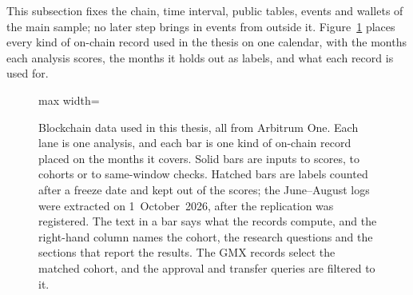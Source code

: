
This subsection fixes the chain, time interval, public tables, events and wallets of the main sample; no later step brings in events from outside it. Figure~\ref{fig:data-overview} places every kind of on-chain record used in the thesis on one calendar, with the months each analysis scores, the months it holds out as labels, and what each record is used for.

\begin{figure}[htbp]
\centering
\begin{adjustbox}{max width=\linewidth}

\end{adjustbox}
\caption[{Blockchain data used in this thesis: sources, months covered, held-out labels and uses.}]{Blockchain data used in this thesis, all from Arbitrum One. Each lane is one analysis, and each bar is one kind of on-chain record placed on the months it covers. Solid bars are inputs to scores, to cohorts or to same-window checks. Hatched bars are labels counted after a freeze date and kept out of the scores; the June--August logs were extracted on 1~October~2026, after the replication was registered. The text in a bar says what the records compute, and the right-hand column names the cohort, the research questions and the sections that report the results. The GMX records select the matched cohort, and the approval and transfer queries are filtered to it.}
\label{fig:data-overview}
\end{figure}

